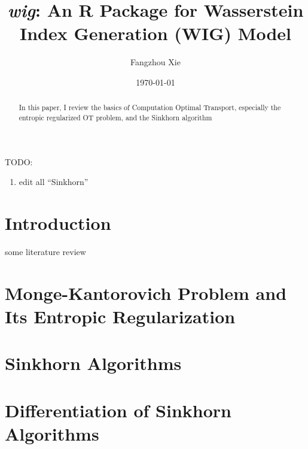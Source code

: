 \documentclass[oneside,12pt,letterpaper]{article}
\title{\textit{\textbf{wig}}: An R Package for Wasserstein Index Generation (WIG) Model}
\author{Fangzhou Xie}
\affil{Department of Economics, Rutgers University}
\date{\today}
\begin{document}
\maketitle



\begin{abstract}
  In this paper, I review the basics of Computation Optimal Transport, especially the entropic regularized OT problem,
  and the Sinkhorn algorithm
\end{abstract}

TODO: {
\color{red}
\begin{enumerate}
  \item edit all ``Sinkhorn''
\end{enumerate}
}


\newpage


\tableofcontents
\newpage


\section{Introduction}


some literature review



\section{Monge-Kantorovich Problem and Its Entropic Regularization}\label{sec:review}



\section{Sinkhorn Algorithms}\label{sec:sinkhorn-algorithm}


\section{Differentiation of Sinkhorn Algorithms}\label{sec:sinkhorn-gradient}

\end{document}
